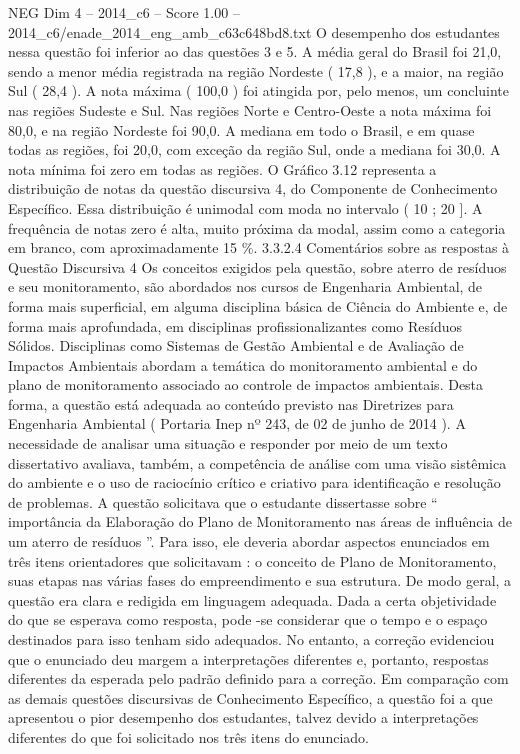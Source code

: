 \begin{textsample}{NEG Dim 4 – 2014\_c6 – Score 1.00 – 2014\_c6/enade\_2014\_eng\_amb\_c63c648bd8.txt}
O desempenho dos estudantes nessa questão foi inferior ao das questões 3 e 5.
A média geral do Brasil foi 21,0, sendo a menor média registrada na região Nordeste ( 17,8 ), e a maior, na região Sul ( 28,4 ).
A nota máxima ( 100,0 ) foi atingida por, pelo menos, um concluinte nas regiões Sudeste e Sul.
Nas regiões Norte e Centro-Oeste a nota máxima foi 80,0, e na região Nordeste foi 90,0.
A mediana em todo o Brasil, e em quase todas as regiões, foi 20,0, com exceção da região Sul, onde a mediana foi 30,0.
A nota mínima foi zero em todas as regiões.
O Gráfico 3.12 representa a distribuição de notas da questão discursiva 4, do Componente de Conhecimento Específico.
Essa distribuição é unimodal com moda no intervalo ( 10 ; 20 ].
A frequência de notas zero é alta, muito próxima da modal, assim como a categoria em branco, com aproximadamente 15 \%. 3.3.2.4 Comentários sobre as respostas à Questão Discursiva 4 Os conceitos exigidos pela questão, sobre aterro de resíduos e seu monitoramento, são abordados nos cursos de Engenharia Ambiental, de forma mais superficial, em alguma disciplina básica de Ciência do Ambiente e, de forma mais aprofundada, em disciplinas profissionalizantes como Resíduos Sólidos.
Disciplinas como Sistemas de Gestão Ambiental e de Avaliação de Impactos Ambientais abordam a temática do monitoramento ambiental e do plano de monitoramento associado ao controle de impactos ambientais.
Desta forma, a questão está adequada ao conteúdo previsto nas Diretrizes para Engenharia Ambiental ( Portaria Inep nº 243, de 02 de junho de 2014 ).
A necessidade de analisar uma situação e responder por meio de um texto dissertativo avaliava, também, a competência de análise com uma visão sistêmica do ambiente e o uso de raciocínio crítico e criativo para identificação e resolução de problemas.
A questão solicitava que o estudante dissertasse sobre “ importância da Elaboração do Plano de Monitoramento nas áreas de influência de um aterro de resíduos ”.
Para isso, ele deveria abordar aspectos enunciados em três itens orientadores que solicitavam : o conceito de Plano de Monitoramento, suas etapas nas várias fases do empreendimento e sua estrutura.
De modo geral, a questão era clara e redigida em linguagem adequada.
Dada a certa objetividade do que se esperava como resposta, pode -se considerar que o tempo e o espaço destinados para isso tenham sido adequados.
No entanto, a correção evidenciou que o enunciado deu margem a interpretações diferentes e, portanto, respostas diferentes da esperada pelo padrão definido para a correção.
Em comparação com as demais questões discursivas de Conhecimento Específico, a questão foi a que apresentou o pior desempenho dos estudantes, talvez devido a interpretações diferentes do que foi solicitado nos três itens do enunciado.

\end{textsample}
